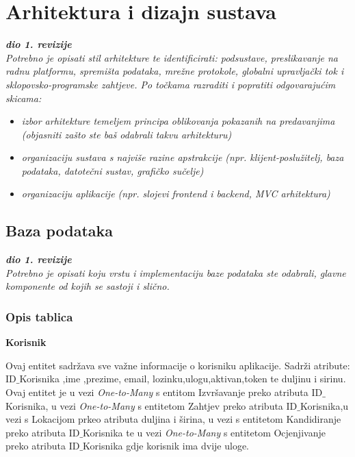 \chapter{Arhitektura i dizajn sustava}
		
		\textbf{\textit{dio 1. revizije}}\\

		\textit{ Potrebno je opisati stil arhitekture te identificirati: podsustave, preslikavanje na radnu platformu, spremišta podataka, mrežne protokole, globalni upravljački tok i sklopovsko-programske zahtjeve. Po točkama razraditi i popratiti odgovarajućim skicama:}
	\begin{itemize}
		\item 	\textit{izbor arhitekture temeljem principa oblikovanja pokazanih na predavanjima (objasniti zašto ste baš odabrali takvu arhitekturu)}
		\item 	\textit{organizaciju sustava s najviše razine apstrakcije (npr. klijent-poslužitelj, baza podataka, datotečni sustav, grafičko sučelje)}
		\item 	\textit{organizaciju aplikacije (npr. slojevi frontend i backend, MVC arhitektura) }		
	\end{itemize}

	
		

		

				
		\section{Baza podataka}
			
			\textbf{\textit{dio 1. revizije}}\\
			
		\textit{Potrebno je opisati koju vrstu i implementaciju baze podataka ste odabrali, glavne komponente od kojih se sastoji i slično.}
		
			\subsection{Opis tablica}
			
					    \textbf{ Korisnik}
		    \item Ovaj entitet sadržava sve važne informacije o korisniku aplikacije. Sadrži atribute: ID${\_}$Korisnika ,ime ,prezime,
		     email, lozinku,ulogu,aktivan,token te duljinu i sirinu. Ovaj entitet je u vezi \emph{One-to-Many} s entitom Izvršavanje preko atributa ID${\_}$Korisnika, u vezi \emph{One-to-Many} s entitetom Zahtjev preko atributa ID${\_}$Korisnika,u vezi s Lokacijom prkeo atributa duljina i širina, u vezi s entitetom Kandidiranje preko atributa ID${\_}$Korisnika te u vezi \emph{One-to-Many} s entitetom Ocjenjivanje preko atributa ID${\_}$Korisnika gdje korisnik ima dvije uloge. 
				

